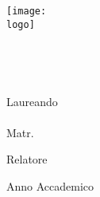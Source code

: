 \thispagestyle{empty}
\begin{center}
    \vspace{8mm}
    {\texttt{[image: \\logo]}}\\
    \vspace{8mm}
    {\large \university} \\
    \vspace{8mm}
    {\large \department} \\
    \vspace{8mm}
    {\large \doctype} \\
    \vspace{10mm}
    {\large\bf \doctitle} \\
    \vspace{8mm}
    {\large Laureando \\ {\bf{\thesisauthor}} \\ Matr. \matriculation }\\
    \vspace{14mm}

    Relatore \\
    \bf{\supervisor}

    \vfill
    {\large Anno Accademico \\ \academicyear} \\
\end{center}
\newpage
